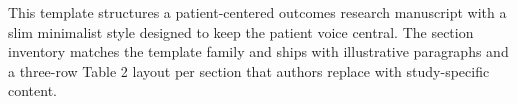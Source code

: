 
This template structures a patient-centered outcomes research manuscript with a slim minimalist style designed to keep the patient voice central. The section inventory matches the template family and ships with illustrative paragraphs and a three-row Table 2 layout per section that authors replace with study-specific content.
